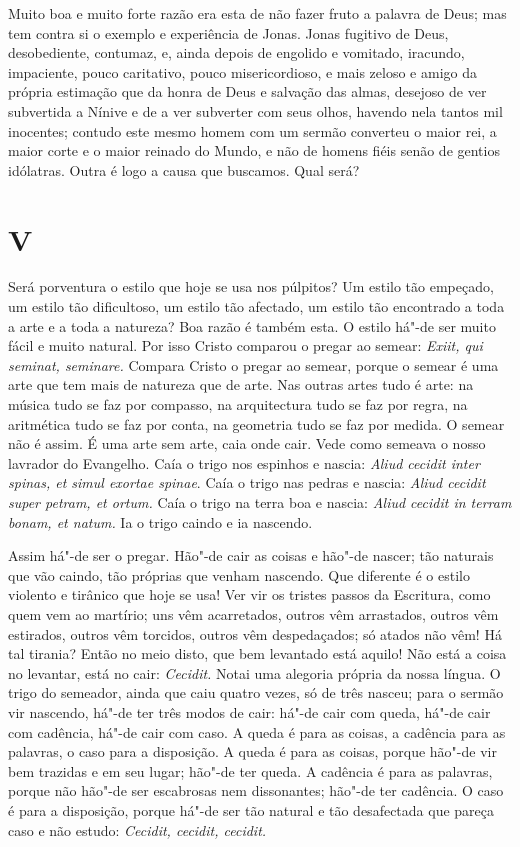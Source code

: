 Muito boa e muito forte razão era esta de não fazer fruto a
palavra de Deus; mas tem contra si o exemplo e experiência de
Jonas. Jonas fugitivo de Deus, desobediente, contumaz, e, ainda depois
de engolido e vomitado, iracundo, impaciente, pouco caritativo, pouco
misericordioso, e mais zeloso e amigo da própria estimação que da honra
de Deus e salvação das almas, desejoso de ver subvertida a Nínive e de a
ver subverter com seus olhos, havendo nela tantos mil inocentes; contudo
este mesmo homem com um sermão converteu o maior rei, a maior corte e o
maior reinado do Mundo, e não de homens fiéis senão de gentios idólatras. Outra é logo a causa que buscamos. Qual será?

\section{V}

Será porventura o estilo que hoje se usa nos púlpitos? Um estilo tão
empeçado, um estilo tão dificultoso, um estilo tão afectado, um estilo
tão encontrado a toda a arte e a toda a natureza? Boa razão é também
esta. O estilo há"-de ser muito fácil e muito natural. Por isso Cristo
comparou o pregar ao semear: \emph{Exiit, qui seminat, seminare.}
Compara Cristo o pregar ao semear, porque o semear é uma arte que tem
mais de natureza que de arte. Nas outras artes tudo é arte: na música
tudo se faz por compasso, na arquitectura tudo se faz por regra, na
aritmética tudo se faz por conta, na geometria tudo se faz por medida.
O semear não é assim. É uma arte sem arte, caia onde cair. Vede como
semeava o nosso lavrador do Evangelho. Caía o trigo nos espinhos e
nascia: \emph{Aliud cecidit inter spinas, et simul exortae spinae}.
Caía o trigo nas pedras e nascia: \emph{Aliud cecidit super petram,
et ortum.} Caía o trigo na terra boa e nascia: \emph{Aliud cecidit
in terram bonam, et natum.} Ia o trigo caindo e ia nascendo.

Assim há"-de ser o pregar. Hão"-de cair as coisas e hão"-de nascer; tão
naturais que vão caindo, tão próprias que venham nascendo. Que
diferente é o estilo violento e tirânico que hoje se usa! Ver vir os
tristes passos da Escritura, como quem vem ao martírio; uns vêm
acarretados, outros vêm arrastados, outros vêm estirados, outros vêm
torcidos, outros vêm despedaçados; só atados não vêm! Há tal tirania?
Então no meio disto, que bem levantado está aquilo! Não está a coisa no
levantar, está no cair: \emph{Cecidit.} Notai uma alegoria própria da
nossa língua. O trigo do semeador, ainda
que caiu quatro vezes, só de três nasceu; para o sermão vir nascendo,
há"-de ter três modos de cair: há"-de cair com queda, há"-de cair com
cadência, há"-de cair com caso. A queda é para as coisas, a cadência para
as palavras, o caso para a disposição. A queda é para as coisas, porque
hão"-de vir bem trazidas e em seu lugar; hão"-de ter queda. A cadência é
para as palavras, porque não hão"-de ser escabrosas nem dissonantes;
hão"-de ter cadência. O caso é para a disposição, porque há"-de ser tão
natural e tão desafectada que pareça caso e não estudo: \emph{Cecidit,
cecidit, cecidit.}

